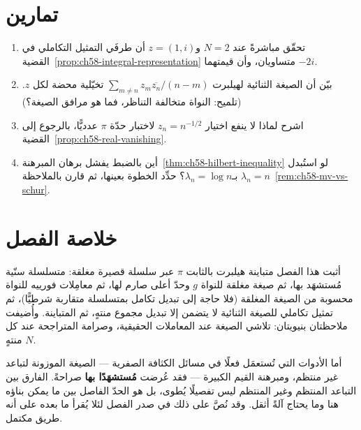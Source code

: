 \section{تمارين}

\begin{enumerate}
  \item تحقّق مباشرةً عند \(N=2\) و\(z=(1,i)\) أن طرفَي التمثيل التكاملي
  في القضية~\ref{prop:ch58-integral-representation} متساويان، وأن
  قيمتهما \(-2i\).
  \item بيّن أن الصيغة الثنائية لهيلبرت \(\sum_{m\ne n}z_m\overline{z_n}/(n-m)\)
  تخيّلية محضة لكل \(z\). (تلميح: النواة متخالفة التناظر، فما هو مرافق
  الصيغة؟)
  \item اشرح لماذا لا ينفع اختيار \(z_n=n^{-1/2}\) لاختبار حدّة \(\pi\)
  عدديًّا، بالرجوع إلى القضية~\ref{prop:ch58-real-vanishing}.
  \item أين بالضبط يفشل برهان المبرهنة~\ref{thm:ch58-hilbert-inequality}
  لو استُبدل \(\lambda_n=n\) بـ\(\lambda_n=\log n\)؟ حدِّد الخطوة
  بعينها، ثم قارن بالملاحظة~\ref{rem:ch58-mv-vs-schur}.
\end{enumerate}

\section{خلاصة الفصل}

أثبت هذا الفصل متباينة هيلبرت بالثابت \(\pi\) عبر سلسلة قصيرة
مغلقة: متسلسلة سنّية مُستشهَد بها، ثم صيغة مغلقة للنواة \(g\) وحدّ أعلى
صارم لها، ثم معامِلات فورييه للنواة محسوبة من الصيغة المغلقة (فلا حاجة
إلى تبديل تكامل بمتسلسلة متقاربة شرطيًّا)، ثم تمثيل تكاملي للصيغة
الثنائية لا يتضمن إلا تبديل مجموع منتهٍ، ثم المتباينة. وأُضيفت ملاحظتان
بنيويتان: تلاشي الصيغة عند المعاملات الحقيقية، وصرامة المتراجحة عند كل
\(N\) منتهٍ.

أما الأدوات التي تُستعمَل فعلًا في مسائل الكثافة الصفرية — الصيغة
الموزونة لتباعد غير منتظم، ومبرهنة القيم الكبيرة — فقد عُرضت
\textbf{مُستشهَدًا بها} صراحةً. الفارق بين التباعد المنتظم وغير المنتظم
ليس تفصيلًا يُطوى، بل هو الحدّ الفاصل بين ما يمكن بناؤه هنا وما يحتاج
آلةً أثقل. وقد نُصَّ على ذلك في صدر الفصل لئلا يُقرأ ما بعده على أنه
طريق مكتمل.
